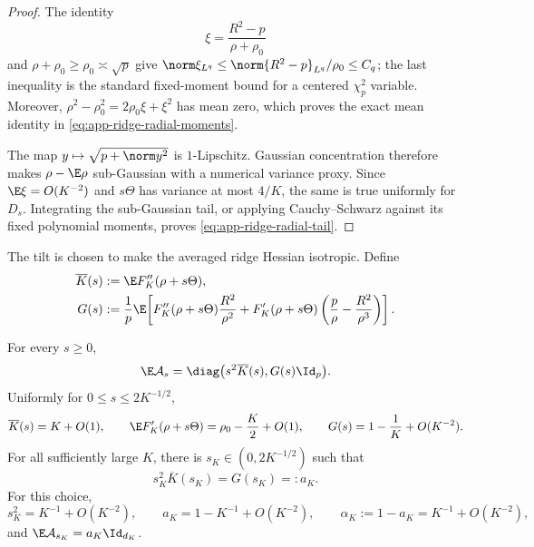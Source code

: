 \begin{proof}
The identity
\[
  \xi=\frac{R^2-p}{\rho+\rho_0}
\]
and \(\rho+\rho_0\geq\rho_0\asymp\sqrt p\) give
\(\norm\xi_{L^q}\leq
\norm{R^2-p}_{L^q}/\rho_0\leq C_q\); the last inequality is the standard
fixed-moment bound for a centered \(\chi_p^2\) variable.  Moreover,
\(\rho^2-\rho_0^2=2\rho_0\xi+\xi^2\) has mean zero, which proves the exact
mean identity in \eqref{eq:app-ridge-radial-moments}.

The map \(y\mapsto\sqrt{p+\norm y^2}\) is \(1\)-Lipschitz.  Gaussian
concentration therefore makes \(\rho-\E\rho\) sub-Gaussian with a numerical
variance proxy.  Since \(\E\xi=O(K^{-2})\) and
\(s\Theta\) has variance at most \(4/K\), the same is true uniformly for
\(D_s\).  Integrating the sub-Gaussian tail, or applying Cauchy--Schwarz
against its fixed polynomial moments, proves
\eqref{eq:app-ridge-radial-tail}.
\end{proof}

The tilt is chosen to make the averaged ridge Hessian isotropic.  Define
\begin{align}
  \overline K(s)
  &:=
  \E F_K''(\rho+s\Theta),
  \label{eq:app-ridge-Kbar}\\
  G(s)
  &:=
  \frac1p\E\!\left[
    F_K''(\rho+s\Theta)\frac{R^2}{\rho^2}
    +
    F_K'(\rho+s\Theta)
    \left(\frac p\rho-\frac{R^2}{\rho^3}\right)
  \right].
  \label{eq:app-ridge-G}
\end{align}

\begin{lemma}
\label{lem:app-ridge-tuning}
For every \(s\geq0\),
\begin{equation}
  \E\mathcal A_s
  =
  \diag\bigl(s^2\overline K(s),G(s)\Id_p\bigr).
  \label{eq:app-ridge-average-Hessian}
\end{equation}
Uniformly for \(0\leq s\leq2K^{-1/2}\),
\begin{equation}
  \overline K(s)=K+O(1),\qquad
  \E F_K'(\rho+s\Theta)=\rho_0-\frac K2+O(1),\qquad
  G(s)=1-\frac1K+O(K^{-2}).
  \label{eq:app-ridge-profile-estimates}
\end{equation}
For all sufficiently large \(K\), there is
\(s_K\in(0,2K^{-1/2})\) such that
\begin{equation}
  s_K^2\overline K(s_K)=G(s_K)=:a_K.
  \label{eq:app-ridge-tuning-equation}
\end{equation}
For this choice,
\begin{equation}
  s_K^2=K^{-1}+O(K^{-2}),\qquad
  a_K=1-K^{-1}+O(K^{-2}),\qquad
  \alpha_K:=1-a_K=K^{-1}+O(K^{-2}),
  \label{eq:app-ridge-tuned-scaling}
\end{equation}
and \(\E\mathcal A_{s_K}=a_K\Id_{d_K}\).
\end{lemma}

